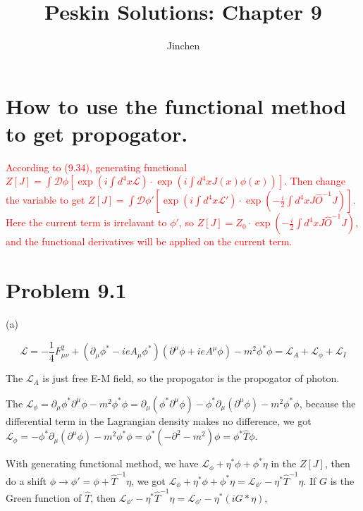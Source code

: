 \documentclass[prd,aps,nofootinbib,floatfix,10pt]{revtex4}
\newcommand{\red}{\textcolor{red}}
\begin{document}
\title{Peskin Solutions: Chapter 9}
\author{Jinchen}
\maketitle


\section{How to use the functional method to get propogator.}

\red{According to (9.34), generating functional $Z[J] = \int \mathcal{D}\phi [\exp(i\int d^4 x \mathcal{L}) \cdot \exp(i\int d^4 x J(x) \phi(x))]$. Then change the variable to get $Z[J] = \int \mathcal{D}\phi' [\exp(i\int d^4 x \mathcal{L'}) \cdot \exp(-\frac{i}{2} \int d^4 x J \hat{O}^{-1} J )]$. Here the current term is irrelavant to $\phi'$, so $Z[J] = Z_0 \cdot \exp(-\frac{i}{2} \int d^4 x J \hat{O}^{-1} J ) $, and the functional derivatives will be applied on the current term. }

\section{Problem 9.1}

\noindent (a)

\[
    \mathcal{L} = - \frac{1}{4} F^2_{\mu \nu} + (\partial_{\mu} \phi^* - i e A_{\mu} \phi^*)(\partial^{\mu} \phi + i e A^{\mu} \phi) - m^2 \phi^* \phi = \mathcal{L}_{A} + \mathcal{L}_{\phi} + \mathcal{L}_{I}
\]

The $\mathcal{L}_{A}$ is just free E-M field, so the propogator is the propogator of photon. 

The $\mathcal{L}_{\phi} = \partial_{\mu} \phi^* \partial^{\mu} \phi - m^2 \phi^* \phi = \partial_{\mu} (\phi^* \partial^{\mu} \phi) - \phi^* \partial_{\mu} (\partial^{\mu} \phi) - m^2 \phi^* \phi$, because the differential term in the Lagrangian density makes no difference, we got $\mathcal{L}_{\phi} = - \phi^* \partial_{\mu} (\partial^{\mu} \phi) - m^2 \phi^* \phi = \phi^* (- \partial^2 - m^2) \phi = \phi^* \hat{T} \phi$.

With generating functional method, we have $\mathcal{L}_{\phi} + \eta^* \phi + \phi^* \eta$ in the $Z[J]$, then do a shift $\phi \to \phi' = \phi + \hat{T}^{-1} \eta$, we got $\mathcal{L}_{\phi} + \eta^* \phi + \phi^* \eta = \mathcal{L}_{\phi'} - \eta^* \hat{T}^{-1} \eta$. If $G$ is the Green function of $\hat{T}$, then $\mathcal{L}_{\phi'} - \eta^* \hat{T}^{-1} \eta = \mathcal{L}_{\phi'} - \eta^* (iG * \eta)$,
\end{document}
